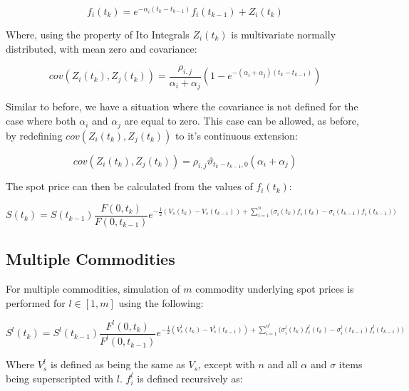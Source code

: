 \documentclass{article}
\begin{document}
\begin{equation}
    f_i(t_k) = e^{-\alpha_i(t_k - t_{k-1})}f_i(t_{k-1}) + Z_i(t_k)
\end{equation}

Where, using the property of Ito Integrals $Z_i(t_k)$ is multivariate normally 
distributed, with mean zero and covariance:

\begin{equation}
    cov(Z_i(t_k), Z_j(t_k)) = \frac{\rho_{i, j}}{\alpha_i + \alpha_j}(1 - 
    e^{-(\alpha_i + \alpha_j)(t_k - t_{k-1})})
\end{equation}

Similar to before, we have a situation where the covariance is not defined for the case
where both $\alpha_i$ and $\alpha_j$ are equal to zero. This case can be allowed, as
before, by redefining $cov(Z_i(t_k), Z_j(t_k))$ to it's continuous extension:

\begin{equation}
    cov(Z_i(t_k), Z_j(t_k)) = \rho_{i, j} \vartheta_{t_k-t_{k-1}, 0}(\alpha_i + \alpha_j)
\end{equation}

\bigskip

The spot price can then be calculated from the values of $f_i(t_k)$:

\begin{equation}
    S(t_k) = S(t_{k-1}) \frac{F(0, t_k)}{F(0, t_{k-1})} e^{- \frac{1}{2} (V_s(t_k) - 
    V_s(t_{k-1})) + \sum_{i=1}^n \bigl(\sigma_i(t_k)f_i(t_k) - \sigma_i(t_{k-1})f_i(t_{k-1})\bigr)}
\end{equation}

\subsection{Multiple Commodities}
For multiple commodities, simulation of $m$ commodity underlying spot prices is 
performed for $l \in [1, m]$ using the following:

\begin{equation}
    S^l(t_k) = S^l(t_{k-1}) \frac{F^l(0, t_k)}{F^l(0, t_{k-1})} e^{- \frac{1}{2} (V_s^l(t_k) - 
    V_s^l(t_{k-1})) + \sum_{i=1}^{n^l} \bigl(\sigma_i^l(t_k)f_i^l(t_k) - \sigma_i^l(t_{k-1})f_i^l(t_{k-1})\bigr)}
\end{equation}

Where $V_s^l$ is defined as being the same as $V_s$, except with $n$ and all $\alpha$ and 
$\sigma$ items being superscripted with $l$. $f_i^l$ is defined recursively as:
\end{document}
